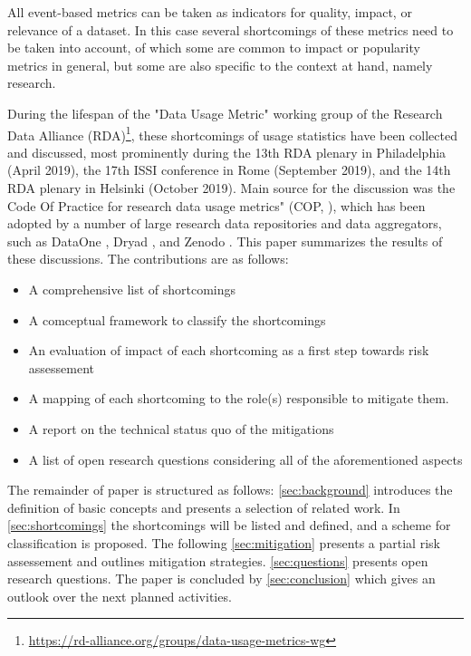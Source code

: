 \documentclass[conference, a4paper]{IEEEtran}\usepackage[]{graphicx}\usepackage[]{color}
\begin{document}
All event-based metrics can be taken as indicators for
quality, impact, or relevance of a dataset.
In this case several shortcomings of these metrics need to be taken into account,
of which some are common to impact or popularity metrics in general,
but some are also specific to the context at hand, namely research.

During the lifespan of the "Data Usage Metric" working group of the Research Data Alliance (RDA)\footnote{\url{https://rd-alliance.org/groups/data-usage-metrics-wg}},
these shortcomings of usage statistics have been collected and discussed,
most prominently during the 13th RDA plenary in Philadelphia (April 2019),
the 17th ISSI conference in Rome (September 2019),
and the 14th RDA plenary in Helsinki (October 2019).
Main source for the discussion was the
Code Of Practice for research data usage metrics" (COP, \cite{cop}),
which has been adopted by a number of large research data repositories and data aggregators,
such as DataOne \cite{dataone},
Dryad \cite{dryad},
and Zenodo \cite{zenodo}.
This paper summarizes the results of these discussions.
The contributions are as follows:
\begin{itemize}
        \item A comprehensive list of shortcomings
        \item A comceptual framework to classify the shortcomings
        \item An evaluation of impact of each shortcoming as a first step towards risk assessement
        \item A mapping of each shortcoming to the role(s) responsible to mitigate them.
        \item A report on the technical status quo of the mitigations
        \item A list of open research questions considering all of the aforementioned aspects
\end{itemize}

The remainder of paper is structured as follows:
\autoref{sec:background} introduces the definition of basic concepts and
presents a selection of related work.
In \autoref{sec:shortcomings} the shortcomings will be listed and defined, and a scheme for classification is proposed.
The following \autoref{sec:mitigation} presents a partial risk assessement and outlines mitigation strategies.
\autoref{sec:questions} presents open research questions.
The paper is concluded by \autoref{sec:conclusion} which gives an outlook
over the next planned activities.
\end{document}
